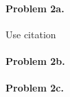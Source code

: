 \documentclass[12pt]{article}
\begin{document}
\paragraph{Problem 2a.}
Use citation \cite{Ding2008}
\paragraph{Problem 2b.}
\paragraph{Problem 2c.}



\end{document}
